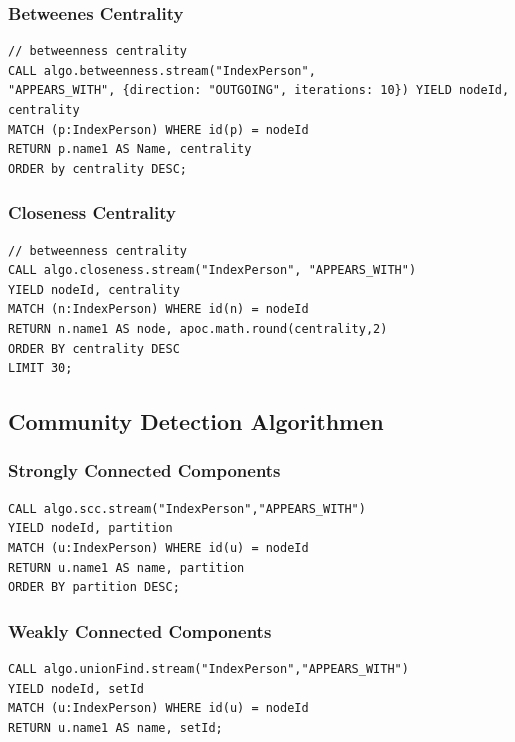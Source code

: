 \documentclass[12pt,ngerman,]{article}
\begin{document}
\subsubsection{Betweenes Centrality}\label{betweenes-centrality}

\begin{verbatim}
// betweenness centrality
CALL algo.betweenness.stream("IndexPerson",
"APPEARS_WITH", {direction: "OUTGOING", iterations: 10}) YIELD nodeId, centrality
MATCH (p:IndexPerson) WHERE id(p) = nodeId
RETURN p.name1 AS Name, centrality
ORDER by centrality DESC;
\end{verbatim}

\subsubsection{Closeness Centrality}\label{closeness-centrality}

\begin{verbatim}
// betweenness centrality
CALL algo.closeness.stream("IndexPerson", "APPEARS_WITH")
YIELD nodeId, centrality
MATCH (n:IndexPerson) WHERE id(n) = nodeId
RETURN n.name1 AS node, apoc.math.round(centrality,2)
ORDER BY centrality DESC
LIMIT 30;
\end{verbatim}

\subsection{Community Detection
Algorithmen}\label{community-detection-algorithmen}

\subsubsection{Strongly Connected
Components}\label{strongly-connected-components}

\begin{verbatim}
CALL algo.scc.stream("IndexPerson","APPEARS_WITH")
YIELD nodeId, partition
MATCH (u:IndexPerson) WHERE id(u) = nodeId
RETURN u.name1 AS name, partition
ORDER BY partition DESC;
\end{verbatim}

\subsubsection{Weakly Connected
Components}\label{weakly-connected-components}

\begin{verbatim}
CALL algo.unionFind.stream("IndexPerson","APPEARS_WITH")
YIELD nodeId, setId
MATCH (u:IndexPerson) WHERE id(u) = nodeId
RETURN u.name1 AS name, setId;
\end{verbatim}
\end{document}

